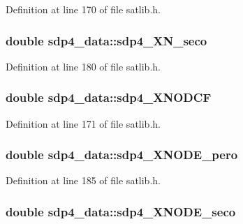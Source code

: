 Definition at line 170 of file satlib.\-h.

\hypertarget{structsdp4__data_a2d0154dbe278519f871ff5d726a095b1}{
\subsubsection[{sdp4\-\_\-\-X\-N\-\_\-seco}]{\setlength{\rightskip}{0pt plus 5cm}double sdp4\-\_\-data\-::sdp4\-\_\-\-X\-N\-\_\-seco}}\label{structsdp4__data_a2d0154dbe278519f871ff5d726a095b1}


Definition at line 180 of file satlib.\-h.

\hypertarget{structsdp4__data_ad30aed7cb81995cbec5b8a860e1f1464}{
\subsubsection[{sdp4\-\_\-\-X\-N\-O\-D\-C\-F}]{\setlength{\rightskip}{0pt plus 5cm}double sdp4\-\_\-data\-::sdp4\-\_\-\-X\-N\-O\-D\-C\-F}}\label{structsdp4__data_ad30aed7cb81995cbec5b8a860e1f1464}


Definition at line 171 of file satlib.\-h.

\hypertarget{structsdp4__data_aec215e13e431b1db9b8c4acd16d7741c}{
\subsubsection[{sdp4\-\_\-\-X\-N\-O\-D\-E\-\_\-pero}]{\setlength{\rightskip}{0pt plus 5cm}double sdp4\-\_\-data\-::sdp4\-\_\-\-X\-N\-O\-D\-E\-\_\-pero}}\label{structsdp4__data_aec215e13e431b1db9b8c4acd16d7741c}


Definition at line 185 of file satlib.\-h.

\hypertarget{structsdp4__data_a5290f14b682ec0da52423219dfb4ce49}{
\subsubsection[{sdp4\-\_\-\-X\-N\-O\-D\-E\-\_\-seco}]{\setlength{\rightskip}{0pt plus 5cm}double sdp4\-\_\-data\-::sdp4\-\_\-\-X\-N\-O\-D\-E\-\_\-seco}}\label{structsdp4__data_a5290f14b682ec0da52423219dfb4ce49}


